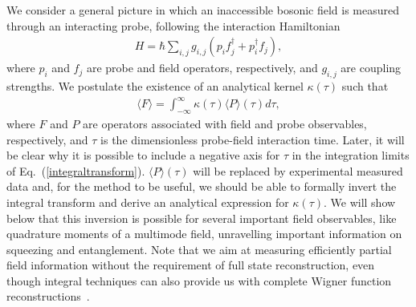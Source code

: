 \documentclass[pra,aps,twocolumn,showpacs]{revtex4}
\begin{document}
We consider a general picture in which an inaccessible bosonic
field is measured through an interacting probe, following the
interaction Hamiltonian
\begin{eqnarray}
\label{hamiltonian} H = \hbar \sum_{i,j} g_{i,j} ( p_i
f_j^{\dagger} + p_i^{\dagger} f_j ) ,
\end{eqnarray}
where $p_i$ and $f_j$ are probe and field operators, respectively,
and $g_{i,j}$ are coupling strengths. We postulate the existence
of an analytical kernel $\kappa (\tau)$ such that
\begin{eqnarray}
\label{integraltransform} \langle F \rangle =
\int_{-\infty}^{\infty} \kappa (\tau) \langle P \rangle (\tau) d
\tau ,
\end{eqnarray}
where $F$ and $P$ are operators associated with field and probe
observables, respectively, and $\tau$ is the dimensionless
probe-field interaction time. Later, it will be clear why it is
possible to include a negative axis for $\tau$ in the integration
limits of Eq.~(\ref{integraltransform}). $\langle P \rangle
(\tau)$ will be replaced by experimental measured data and, for
the method to be useful, we should be able to formally invert the
integral transform and derive an analytical expression for
$\kappa(\tau)$. We will show below that this inversion is possible
for several important field observables, like quadrature moments
of a multimode field, unravelling important information on
squeezing and entanglement. Note that we aim at measuring
efficiently partial field information without the requirement of
full state reconstruction, even though integral techniques can
also provide us with complete Wigner function
reconstructions~\cite{Fresnel}.
\end{document}
